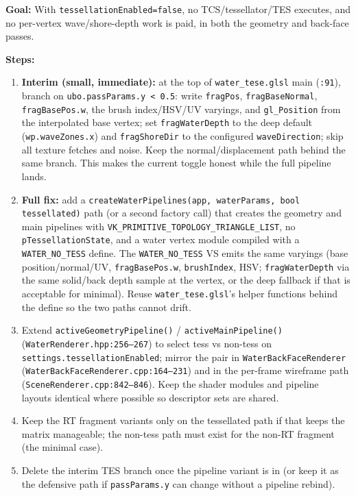 \documentclass[11pt,a4paper]{article}
\begin{document}
\begin{tcolorbox}[promptbox={Prompt: Remove the Tessellation Stages When Tessellation Is Off}]
\textbf{Goal:} With \texttt{tessellationEnabled=false}, no TCS/tessellator/TES executes, and no per-vertex wave/shore-depth work is paid, in both the geometry and back-face passes.

\textbf{Steps:}
\begin{enumerate}
    \item \textbf{Interim (small, immediate):} at the top of \texttt{water\_tese.glsl} main (\texttt{:91}), branch on \texttt{ubo.passParams.y < 0.5}: write \texttt{fragPos},
    \texttt{fragBaseNormal}, \texttt{fragBasePos.w}, the brush index/HSV/UV varyings, and \texttt{gl\_Position} from the interpolated base vertex; set \texttt{fragWaterDepth} to the
    deep default (\texttt{wp.waveZones.x}) and \texttt{fragShoreDir} to the configured \texttt{waveDirection}; skip all texture fetches and noise. Keep the normal/displacement path
    behind the same branch. This makes the current toggle honest while the full pipeline lands.
    \item \textbf{Full fix:} add a \texttt{createWaterPipelines(app, waterParams, bool tessellated)} path (or a second factory call) that creates the geometry and main pipelines
    with \texttt{VK\_PRIMITIVE\_TOPOLOGY\_TRIANGLE\_LIST}, no \texttt{pTessellationState}, and a water vertex module compiled with a \texttt{WATER\_NO\_TESS} define. The
    \texttt{WATER\_NO\_TESS} VS emits the same varyings (base position/normal/UV, \texttt{fragBasePos.w}, \texttt{brushIndex}, HSV; \texttt{fragWaterDepth} via the same solid/back
    depth sample at the vertex, or the deep fallback if that is acceptable for minimal). Reuse \texttt{water\_tese.glsl}'s helper functions behind the define so the two paths
    cannot drift.
    \item Extend \texttt{activeGeometryPipeline()} / \texttt{activeMainPipeline()} (\texttt{WaterRenderer.hpp:256--267}) to select tess vs non-tess on
    \texttt{settings.tessellationEnabled}; mirror the pair in \texttt{WaterBackFaceRenderer} (\texttt{WaterBackFaceRenderer.cpp:164--231}) and in the per-frame wireframe path
    (\texttt{SceneRenderer.cpp:842--846}). Keep the shader modules and pipeline layouts identical where possible so descriptor sets are shared.
    \item Keep the RT fragment variants only on the tessellated path if that keeps the matrix manageable; the non-tess path must exist for the non-RT fragment (the minimal case).
    \item Delete the interim TES branch once the pipeline variant is in (or keep it as the defensive path if \texttt{passParams.y} can change without a pipeline rebind).
\end{enumerate}


\end{tcolorbox}
\end{document}
